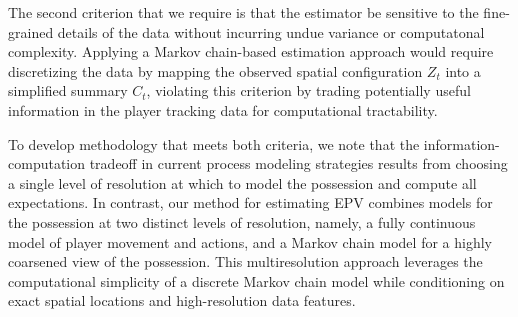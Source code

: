 \documentclass[EPV_JASA.tex]{subfiles}
\begin{document}
The second criterion that we require is that the estimator be sensitive to the fine-grained details of the data without incurring undue variance or computatonal complexity. Applying a Markov chain-based estimation approach would require discretizing the data by mapping the observed spatial configuration $Z_t$ into a simplified summary $C_t$, violating this criterion by trading potentially useful information in the player tracking data for computational tractability.

To develop methodology that meets both criteria, we note that the information-computation tradeoff in current process modeling strategies results from choosing a single level of resolution at which to model the possession and compute all expectations. In contrast, our method for estimating EPV combines models for the possession at two distinct levels of resolution, namely, a fully continuous model of player movement and actions, and a Markov chain model for a highly coarsened view of the possession. This multiresolution approach leverages the computational simplicity of a discrete Markov chain model while conditioning on exact spatial locations and high-resolution data features.

\end{document}
